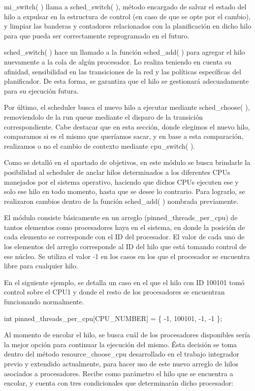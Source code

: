 mi\_switch( ) llama a sched\_switch( ), método encargado de salvar el estado del hilo a expulsar en la estructura de control (en caso de que se opte por el cambio), y limpiar las banderas y contadores relacionados con la planificación en dicho hilo para que pueda ser correctamente reprogramado en el futuro.

sched\_switch( ) hace un llamado a la función sched\_add( ) para agregar el hilo nuevamente a la cola de algún procesador. Lo realiza teniendo en cuenta su afinidad, sensibilidad en las transiciones de la red y las políticas específicas del planificador. De esta forma, se garantiza que el hilo se gestionará adecuadamente para su ejecución futura.

Por último, el scheduler busca el nuevo hilo a ejecutar mediante sched\_choose( ), removiendolo de la run queue mediante el disparo de la transición correspondiente. Cabe destacar que en esta sección, donde elegimos el nuevo hilo, comparamos si es el mismo que queríamos sacar, y en base a esta comparación, realizamos o no el cambio de contexto mediante cpu\_switch( ).

Como se detalló en el apartado de objetivos, en este módulo se busca brindarle la posibilidad al scheduler de anclar hilos determinados a los diferentes CPUs manejados por el sistema operativo, haciendo que dichos CPUs ejecuten ese y solo ese hilo en todo momento, hasta que se desee lo contrario. Para lograrlo, se realizaron cambios dentro de la función sched\_add( ) nombrada previamente.

El módulo consiste básicamente en un arreglo (pinned\_threads\_per\_cpu) de tantos elementos como procesadores haya en el sistema, en donde la posición de cada elemento se corresponde con el ID del procesador. El valor de cada uno de los elementos del arreglo corresponde al ID del hilo que está tomando control de ese núcleo. Se utiliza el valor -1 en los casos en los que el procesador se encuentra libre para cualquier hilo.

En el siguiente ejemplo, se detalla un caso en el que el hilo con ID 100101 tomó control sobre el CPU1 y donde el resto de los procesadores se encuentran funcionando normalmente.

int pinned\_threads\_per\_cpu[CPU\_NUMBER] = \{ -1, 100101, -1, -1 \};

Al momento de encolar el hilo, se busca cuál de los procesadores disponibles sería la mejor opción para continuar la ejecución del mismo. Ésta decisión se toma dentro del método resource\_choose\_cpu desarrollado en el trabajo integrador previo y extendido actualmente, para hacer uso de este nuevo arreglo de hilos asociados a procesadores. Recibe como parámetro el hilo que se encuentra a encolar, y cuenta con tres condicionales que determinarán dicho procesador:

